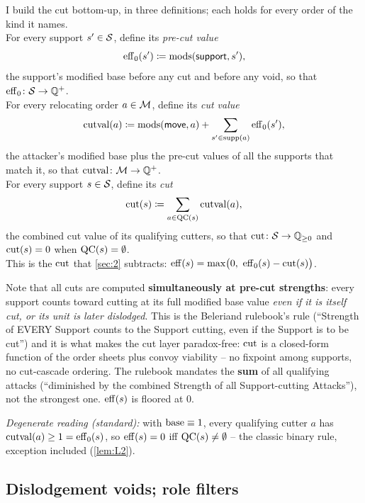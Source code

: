 \documentclass[12pt,a4paper]{article}
\begin{document}
I build the cut bottom-up, in three definitions; each holds for every order of the kind it names.\\
For every support $s' \in \mathcal{S}$, define its \emph{pre-cut value}
\[
\operatorname{eff}_0(s') \coloneqq \operatorname{mods}(\mathsf{support}, s'),
\]
the support's modified base before any cut and before any void, so that $\operatorname{eff}_0\colon \mathcal{S} \to \mathbb{Q}^{+}$.\\
For every relocating order $a \in \mathcal{M}$, define its \emph{cut value}
\[
\operatorname{cutval}(a) \coloneqq \operatorname{mods}(\mathsf{move}, a) + \sum_{s' \in \operatorname{supp}(a)} \operatorname{eff}_0(s'),
\]
the attacker's modified base plus the pre-cut values of all the supports that match it, so that $\operatorname{cutval}\colon \mathcal{M} \to \mathbb{Q}^{+}$.\\
For every support $s \in \mathcal{S}$, define its \emph{cut}
\[
\operatorname{cut}(s) \coloneqq \sum_{a \in \operatorname{QC}(s)} \operatorname{cutval}(a),
\]
the combined cut value of its qualifying cutters, so that $\operatorname{cut}\colon \mathcal{S} \to \mathbb{Q}_{\ge 0}$ and $\operatorname{cut}(s) = 0$ when $\operatorname{QC}(s) = \emptyset$.\\
This is the $\operatorname{cut}$ that \cref{sec:2} subtracts: $\operatorname{eff}(s) = \max\bigl(0,\ \operatorname{eff}_0(s) - \operatorname{cut}(s)\bigr)$.

Note that all cuts are computed \textbf{simultaneously at pre-cut strengths}: every support counts toward cutting at its full modified base value \emph{even if it is itself cut, or its unit is later dislodged}.
This is the Beleriand rulebook's rule (``Strength of EVERY Support counts to the Support cutting, even if the Support is to be cut'') and it is what makes the cut layer paradox-free: $\operatorname{cut}$ is a closed-form function of the order sheets plus convoy viability -- no fixpoint among supports, no cut-cascade ordering.
The rulebook mandates the \textbf{sum} of all qualifying attacks (``diminished by the combined Strength of all Support-cutting Attacks''), not the strongest one.
$\operatorname{eff}(s)$ is floored at 0.

\emph{Degenerate reading (standard):} with $\operatorname{base} \equiv 1$, every qualifying cutter $a$ has $\operatorname{cutval}(a) \ge 1 = \operatorname{eff}_0(s)$, so $\operatorname{eff}(s) = 0$ iff $\operatorname{QC}(s) \ne \emptyset$ -- the classic binary rule, exception included (\cref{lem:L2}).

\subsection{Dislodgement voids; role filters}\label{sec:3.3}
\end{document}
